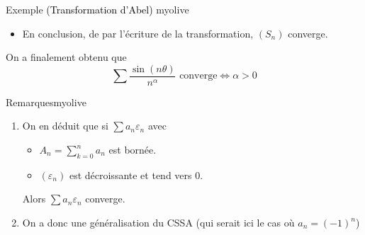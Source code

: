 \begin{omed}{Exemple \textcolor{black}{(Transformation d’Abel)} }{myolive}
\begin{itemize}
\begin{itemize}
                Pour $n \in \mathbb{N}^*$, on a 
                \begin{align*}
                    \abs{A_n \left(\varepsilon_n - \varepsilon_{n+1}\right)} 
                    &\leq \overbrace{\frac{1}{\abs{\sin(\theta/2)}}}^{= M} \overbrace{\abs{\varepsilon_n - \varepsilon_{n+1}}}^{\geq 0} \\
                    &= M \left(\varepsilon_n - \varepsilon_{n+1}\right)
                \end{align*}
                Donc 
                \begin{align*}
                    \sum_{k=1}^{n} \abs{A_k \left(\varepsilon_k - \varepsilon_{k+1}\right)}
                    &\leq M \sum_{k=1}^{n} (\varepsilon_k - \varepsilon_{k+1}) \\
                    &= M (\varepsilon_1 - \varepsilon_{n+1}) \\
                    &= M \varepsilon_1
                \end{align*}
                D’où $\sum \abs{A_n \left(\varepsilon_n - \varepsilon_{n+1}\right)}$ est à termes positifs, avec des sommes partielles majorées, donc converge. Donc $\sum A_n \left(\varepsilon_n - \varepsilon_{n+1}\right)$ est absolument convergente \textit{i.e.} converge.
                \item En conclusion, de par l’écriture de la transformation, $(S_n)$ converge.
            \end{itemize}
    
            On a finalement obtenu que 
            \[ \sum \frac{\sin(n \theta)}{n^{\alpha}} \text{ converge} \iff \alpha > 0 \] 
        \end{itemize}
        \end{omed}
    
        \begin{omed}{Remarques}{myolive}
            \begin{enumerate}
                \item On en déduit que si $\sum a_n \varepsilon_n$ avec 
            \begin{itemize}
                \item $A_n = \sum_{k=0}^{n} a_n$ est bornée.
                \item $(\varepsilon_n)$ est décroissante et tend vers 0.
            \end{itemize}
            Alors $\sum a_n \varepsilon_n$ converge.
            \item On a donc une généralisation du CSSA (qui serait ici le cas où $a_n = (-1)^n$)
            \end{enumerate}
        \end{omed}

